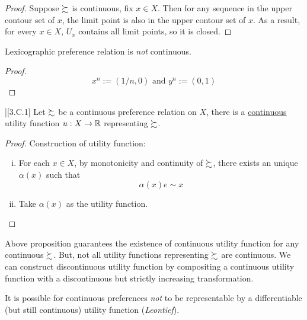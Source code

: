 \documentclass{report}
\begin{document}
 			\begin{proof}
 				Suppose $\succsim$ is continuous, fix $x \in X$. Then for any sequence in the upper contour set of $x$, the limit point is also in the upper contour set of $x$. As a result, for every $x \in X$, $U_x$ contains all limit points, so it is closed.
 			\end{proof}
 			
 			\begin{proposition}
 				Lexicographic preference relation is \emph{not} continuous.
 			\end{proposition}
 			
 			\begin{proof}
 				\begin{equation}
 					x^{n}:=(1 / n, 0) \text { and } y^{n}:=(0,1)
 				\end{equation}
 			\end{proof}
 			
 			\begin{proposition}][3.C.1]
 				Let $\succsim$ be a continuous preference relation on $X$, there is a \ul{continuous} utility function $u: X \to \mathbb{R}$ representing $\succsim$.
 			\end{proposition}
 			
 			\begin{proof}
 				Construction of utility function:
 				\begin{enumerate}[(i)]
 					\item For each $x \in X$, by monotonicity and continuity of $\succsim$, there exists an unique $\alpha(x)$ such that 
 					\begin{equation}
 						\alpha(x) e \sim x
 					\end{equation}
 					\item Take $\alpha(x)$ as the utility function.
 				\end{enumerate}
 			\end{proof}
 			
 			\begin{remark}
 				Above proposition guarantees the existence of continuous utility function for any continuous $\succsim$. But, not all utility functions representing $\succsim$ are continuous. We can construct discontinuous utility function by compositing a continuous utility function with a discontinuous but strictly increasing transformation.
 			\end{remark}
 			
 			\begin{remark}
 				It is possible for continuous preferences \emph{not} to be representable by a differentiable (but still continuous) utility function (\emph{Leontief}).
 			\end{remark}
 			
\end{document}
